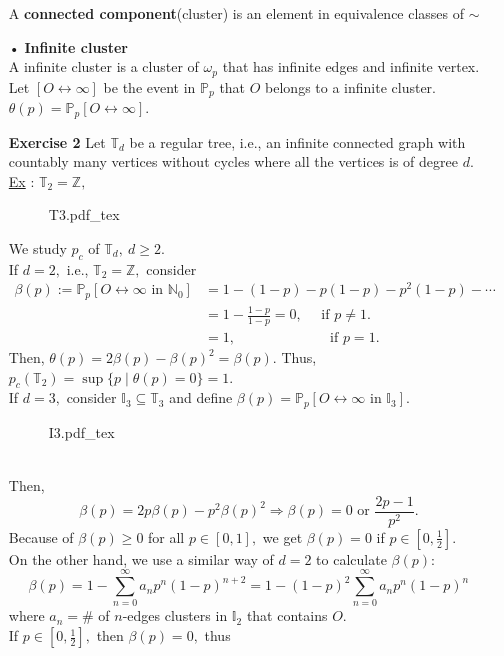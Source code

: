 \documentclass[12pt,a4paper]{report}
\theoremstyle{definition}
\newcommand{\SOL}{\fbox{ \tt s\parbox[b][2pt][c]{6pt}{o}\hspace*{-7pt} L:}}
\newcommand{\incfig}[1]{%
{#1.pdf_tex}
}
\begin{document}
\begin{flushleft}
\begin{enumerate}
	A \textbf{connected component}(cluster) is an element in equivalence classes of $\sim$ 
	\item[•] \textbf{Infinite cluster}\\
	A infinite cluster is a cluster of $\omega_p$ that has infinite edges and infinite vertex.\\
	Let $[O\leftrightarrow \infty]$ be the event in $\mathbb{P}_p$ that $O$ belongs to a infinite cluster.\\
	$\theta(p)=\mathbb{P}_p[O\leftrightarrow\infty].$
	\item[\textbf{Exercise 2}] Let $\mathbb{T}_d$ be a regular tree, i.e., an infinite connected graph with countably many vertices without cycles where all the vertices is of degree $d.$ \underline{Ex} : $\mathbb{T}_2=\mathbb{Z},$
	\newpage
	\begin{figure}[htp]
	\centering
	\def\svgwidth{5cm}
	\incfig{T3}
	\end{figure}
	\item[\SOL] We study $p_c$ of $\mathbb{T}_d,\ d\geq 2.$\\
	If $d=2,$ i.e., $\mathbb{T}_2=\mathbb{Z},$ consider 
	\begin{align*}
	\beta(p):=\mathbb{P}_p[O\leftrightarrow\infty\mbox{ in }\mathbb{N}_0]&=1-(1-p)-p(1-p)-p^2(1-p)-\cdots\\
	&=1-\frac{1-p}{1-p}=0,\quad \mbox{ if } p\neq 1.\\
	&=1,\ \, \qquad\qquad\qquad \mbox{ if }p=1.
	\end{align*}
	Then, $\theta(p)=2\beta(p)-\beta(p)^2=\beta(p).$
	Thus, $p_c(\mathbb{T}_2)=\sup\{p\mid \theta(p)=0\}=1.$\\[4pt]
	If $d=3,$ consider $\mathbb{I}_3\subseteq \mathbb{T}_3$ and define $\beta(p)=\mathbb{P}_p[O\leftrightarrow\infty\mbox{ in }\mathbb{I}_3].$
	\begin{figure}[htp]
	\centering
	\def\svgwidth{5cm}
	\incfig{I3}
	\end{figure}\\
	Then,
	\[
	\beta(p)=2p\beta(p)-p^2\beta(p)^2\Rightarrow \beta(p)=0\mbox{ or }\frac{2p-1}{p^2}.
	\]
	Because of $\beta(p)\geq 0$ for all $p\in [0,1],$ we get $\beta(p)=0$ if $p\in [0,\frac{1}{2}].$\\
	On the other hand, we use a similar way of $d=2$ to calculate $\beta(p):$
	\[
	\beta(p)=1-\sum_{n=0}^\infty a_np^n(1-p)^{n+2}=1-(1-p)^2\sum_{n=0}^\infty a_np^n(1-p)^n
	\]
	where $a_n=\#$ of $n$-edges clusters in $\mathbb{I}_2$ that contains $O.$\\
	If $p\in [0,\frac{1}{2}],$ then $\beta(p)=0,$ thus 

\end{enumerate}
\end{flushleft}
\end{document}
